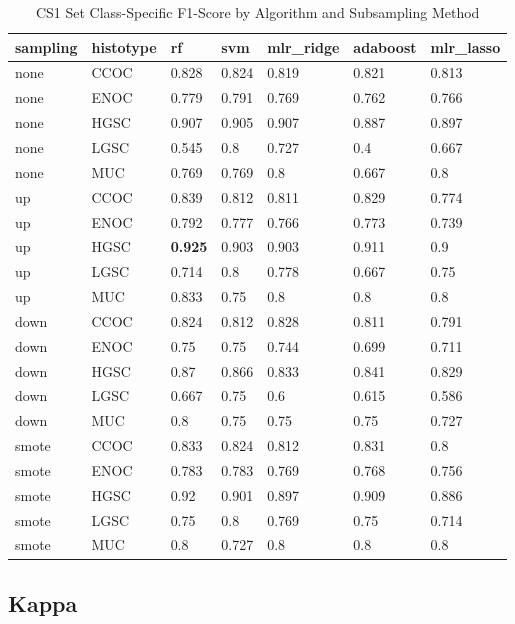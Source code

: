 \documentclass[
]{report}
\begin{document}
\begin{table}

\caption{\label{tab:cs1-f1-class-table}CS1 Set Class-Specific F1-Score by Algorithm and Subsampling Method}
\centering
\begin{tabular}[t]{l|l|l|l|l|l|l}
\hline
sampling & histotype & rf & svm & mlr\_ridge & adaboost & mlr\_lasso\\
\hline
none & CCOC & 0.828 & 0.824 & 0.819 & 0.821 & 0.813\\
\hline
none & ENOC & 0.779 & 0.791 & 0.769 & 0.762 & 0.766\\
\hline
none & HGSC & 0.907 & 0.905 & 0.907 & 0.887 & 0.897\\
\hline
none & LGSC & 0.545 & 0.8 & 0.727 & 0.4 & 0.667\\
\hline
none & MUC & 0.769 & 0.769 & 0.8 & 0.667 & 0.8\\
\hline
up & CCOC & 0.839 & 0.812 & 0.811 & 0.829 & 0.774\\
\hline
up & ENOC & 0.792 & 0.777 & 0.766 & 0.773 & 0.739\\
\hline
up & HGSC & \textbf{0.925} & 0.903 & 0.903 & 0.911 & 0.9\\
\hline
up & LGSC & 0.714 & 0.8 & 0.778 & 0.667 & 0.75\\
\hline
up & MUC & 0.833 & 0.75 & 0.8 & 0.8 & 0.8\\
\hline
down & CCOC & 0.824 & 0.812 & 0.828 & 0.811 & 0.791\\
\hline
down & ENOC & 0.75 & 0.75 & 0.744 & 0.699 & 0.711\\
\hline
down & HGSC & 0.87 & 0.866 & 0.833 & 0.841 & 0.829\\
\hline
down & LGSC & 0.667 & 0.75 & 0.6 & 0.615 & 0.586\\
\hline
down & MUC & 0.8 & 0.75 & 0.75 & 0.75 & 0.727\\
\hline
smote & CCOC & 0.833 & 0.824 & 0.812 & 0.831 & 0.8\\
\hline
smote & ENOC & 0.783 & 0.783 & 0.769 & 0.768 & 0.756\\
\hline
smote & HGSC & 0.92 & 0.901 & 0.897 & 0.909 & 0.886\\
\hline
smote & LGSC & 0.75 & 0.8 & 0.769 & 0.75 & 0.714\\
\hline
smote & MUC & 0.8 & 0.727 & 0.8 & 0.8 & 0.8\\
\hline
\end{tabular}
\end{table}

\hypertarget{kappa-2}{%
\subsection{Kappa}\label{kappa-2}}
\end{document}
